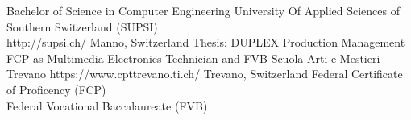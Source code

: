 \begin{CV}
    {Bachelor of Science in Computer Engineering}
    {\small University Of Applied Sciences of Southern Switzerland (SUPSI)\\}
    {http://supsi.ch/}
    {Manno, Switzerland}
    {Thesis: DUPLEX Production Management}
    {FCP as Multimedia Electronics Technician and FVB}
    {Scuola Arti e Mestieri Trevano}
    {https://www.cpttrevano.ti.ch/}
    {Trevano, Switzerland}
    {Federal Certificate of Proficency (FCP)\\Federal Vocational Baccalaureate (FVB)}
\end{CV}